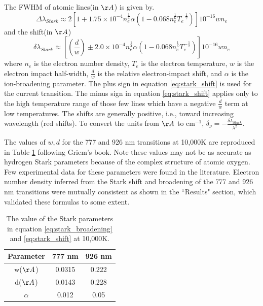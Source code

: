 \documentclass[12pt]{iopart}
\begin{document}
The FWHM of atomic lines(in $\AA$) is given by\cite{huddlestone_plasma_1965, baer1992d, griem_2012_parameters}.
\begin{equation}\label{eq:stark_broadening}
    \Delta\lambda_{Stark} \approx  2 [1 + 1.75 \times 10^{-4} n_e ^{\frac{1}{4}} \alpha (1-0.068 n_e ^{\frac{1}{6}}T_e^{-\frac{1}{2}})]10^{-16}wn_e
\end{equation}
and the shift(in $\AA$)
\begin{equation}\label{eq:stark_shift}
    \delta\lambda_{Stark} \approx [(\frac{d}{w}) \pm 2.0 \times 10^{-4} n_e^{\frac{1}{4}} \alpha (1-0.068 n_e ^{\frac{1}{6}}T_e^{-\frac{1}{2}})]10^{-16}wn_e
\end{equation}
where $n_e$ is the electron number density, $T_e$ is the electron temperature, $w$ is the electron impact half-width, $\frac{d}{w}$ is the relative electron-impact shift, and $\alpha$ is the ion-broadening parameter.  The plus sign in equation \ref{eq:stark_shift} is used for the current transition. The minus sign in equation \ref{eq:stark_shift} applies only to the high temperature range of those few lines which have a negative $\frac{d}{w}$ term at low temperatures. The shifts are generally positive, i.e., toward increasing wavelength (red shifts). To convert the units from $\AA$ to cm$^{-1}$, $\delta_\nu = - \frac{\delta\lambda_{Stark}}{\lambda^2}$.

The values of $w,d$ for the 777 and 926 nm transitions at 10,000K are reproduced in Table \ref{tab:Stark_parameters} following Griem's book\cite{griem_2012_parameters}. Note these values may not be as accurate as hydrogen Stark parameters because of the complex structure of atomic oxygen. Few experimental data for these parameters were found in the literature. Electron number density inferred from the Stark shift and broadening of the 777 and 926 nm transitions were mutually consistent as shown  in the ``Results" section, which validated these formulas to some extent. 

\begin{table}[h]
\centering
\caption{\label{tab:Stark_parameters} The value of the Stark parameters  in equation \ref{eq:stark_broadening} and \ref{eq:stark_shift}\cite{griem_2012_parameters} at 10,000K.}
\begin{tabular}{ccc}
Parameter & 777 nm     &926 nm\\\hline
 w($\AA$) & 0.0315    &0.222   \\
 d($\AA$) & 0.0143    &0.228     \\
 $\alpha$ & 0.012     &0.05\\
\end{tabular}
\end{table}
\end{document}
